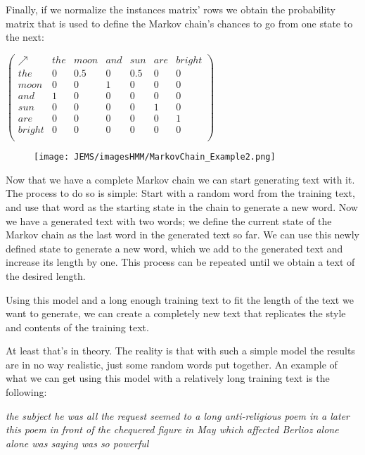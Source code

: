 \documentclass[12pt]{article}
\numberwithin{equation}{section}
\begin{document}
Finally, if we normalize the instances matrix' rows we obtain the probability matrix that is used to define the Markov chain's chances to go from one state to the next:

\begin{center}
$\begin{pmatrix}
\nearrow & the & moon & and & sun & are & bright \\
the & 0 & 0.5 & 0 & 0.5 & 0 & 0 \\
moon & 0 & 0 & 1 & 0 & 0 & 0 \\
and & 1 & 0 & 0 & 0 & 0 & 0 \\
sun & 0 & 0 & 0 & 0 & 1 & 0 \\
are & 0 & 0 & 0 & 0 & 0 & 1 \\
bright & 0 & 0 & 0 & 0 & 0 & 0 \\
\end{pmatrix}$
\end{center}

\begin{figure}[H]
\begin{center}
    \texttt{[image: JEMS/imagesHMM/MarkovChain\_Example2.png]}
\end{center}
\end{figure}

Now that we have a complete Markov chain we can start generating text with it. The process to do so is simple: Start with a random word from the training text, and use that word as the starting state in the chain to generate a new word. Now we have a generated text with two words; we define the current state of the Markov chain as the last word in the generated text so far. We can use this newly defined state to generate a new word, which we add to the generated text and increase its length by one. This process can be repeated until we obtain a text of the desired length.

\bigskip

Using this model and a long enough training text to fit the length of the text we want to generate, we can create a completely new text that replicates the style and contents of the training text.

At least that's in theory. The reality is that with such a simple model the results are in no way realistic, just some random words put together. An example of what we can get using this model with a relatively long training text is the following:

\textit{the subject he was all the request seemed to a long anti-religious poem in a later this poem in front of the chequered figure in May which affected Berlioz alone alone was saying was so powerful}
\end{document}
